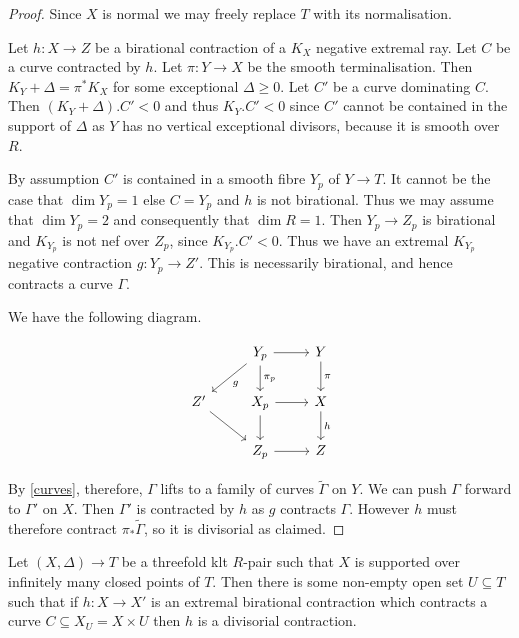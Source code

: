 \documentclass[a4paper,12pt]{amsart}
\begin{document}
	\begin{proof}
		
		Since $X$ is normal we may freely replace $T$ with its normalisation.
		
		Let $h:X \to Z$ be a birational contraction of a $K_{X}$ negative extremal ray. Let $C$ be a curve contracted by $h$. Let $\pi:Y \to X$ be the smooth terminalisation. Then $K_{Y}+\Delta=\pi^{*}K_{X}$ for some exceptional $\Delta \geq 0$. Let $C'$ be a curve dominating $C$. Then $(K_{Y}+\Delta).C' <0$ and thus $K_{Y}.C' < 0$ since $C'$ cannot be contained in the support of $\Delta$ as $Y$ has no vertical exceptional divisors, because it is smooth over $R$.
		
		By assumption $C'$ is contained in a smooth fibre $Y_{p}$ of $Y \to T$. It cannot be the case that $\dim Y_{p}=1$ else $C=Y_{p}$ and $h$ is not birational. Thus we may assume that $\dim Y_{p}=2$ and consequently that $\dim R=1$. Then $Y_{p} \to Z_{p}$ is birational and $K_{Y_{p}}$ is not nef over $Z_{p}$, since $K_{Y_{p}}.C' < 0$. Thus we have an extremal $K_{Y_{p}}$ negative contraction $g:Y_{p} \to Z'$. This is necessarily birational, and hence contracts a curve $\Gamma$.
		
		We have the following diagram.
		
		\[\begin{tikzcd}
		& Y_{p} \arrow[ld, "g"] \arrow[r]  \arrow[d, "\pi_{p}"]& Y \arrow[d, "\pi"] \\
		Z' \arrow[rd]         & X_{p} \arrow[r] \arrow[d]         & X \arrow[d, "h"]   \\
		& Z_{p} \arrow[r]                & Z                 
		\end{tikzcd}\]
		
		
		By \autoref{curves}, therefore, $\Gamma$ lifts to a family of curves $\tilde{\Gamma}$ on $Y$. We can push $\Gamma$ forward to $\Gamma'$ on $X$. Then $\Gamma'$ is contracted by $h$ as $g$ contracts $\Gamma$. However $h$ must therefore contract $\pi_{*}\tilde{\Gamma}$, so it is divisorial as claimed. 		
	\end{proof}

	
	\begin{theorem}
		Let $(X,\Delta) \to T$ be a threefold klt $R$-pair such that $X$ is supported over infinitely many closed points of $T$. Then there is some non-empty open set $U \subseteq T$ such that if $h:X \to X'$ is an extremal birational contraction which contracts a curve $C\subseteq X_{U}=X\times U$ then $h$ is a divisorial contraction.
	\end{theorem}
	
\end{document}
